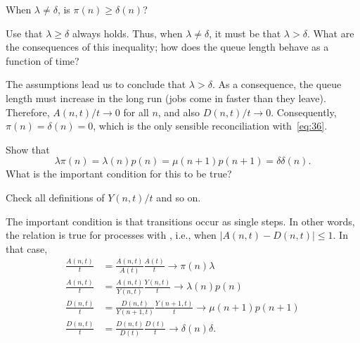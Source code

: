 \begin{exercise}
 When $\lambda\neq \delta$, is $\pi(n)\geq \delta(n)$? 
\begin{hint}
 Use that $\lambda \geq \delta$ always holds. Thus, when $\lambda \neq \delta$, it must be that $\lambda > \delta$. What are the consequences of this inequality; how does the queue length behave as a function of time?
\end{hint}
\begin{solution}
 The assumptions lead us to conclude that $\lambda > \delta$. As a consequence, the queue length must increase in the long run (jobs come in faster than they leave). Therefore, $A(n,t)/t \to 0$ for all $n$, and also $D(n,t)/t\to 0$. Consequently, $\pi(n) = \delta(n) = 0$, which is the only sensible reconciliation with~\cref{eq:36}. 
\end{solution}
\end{exercise}

\begin{extra}
Show that 
\begin{equation*}
\lambda \pi(n) = \lambda(n) p(n) = \mu(n+1) p(n+1) = \delta \delta(n).
\end{equation*}
What is the important condition for this to be true?
\begin{hint}
Check all definitions of $Y(n,t)/t$ and so on.
\end{hint}
\begin{solution}
 The important condition is that transitions occur as single
 steps. In other words, the relation is true for processes with
 , i.e., when $|A(n,t) - D(n,t)|\leq 1$.
 In that case, 
\begin{align*}
 \frac{A(n,t)}{t} &= \frac{A(n,t)}{A(t)} \frac{A(t)}{t} \to \pi(n) \lambda\\
 \frac{A(n,t)}{t} &= \frac{A(n,t)}{Y(n,t)} \frac{Y(n,t)}{t} \to \lambda(n)p(n)\\
 \frac{D(n,t)}{t} &= \frac{D(n,t)}{Y(n+1,t)} \frac{Y(n+1,t)}{t} \to \mu(n+1)p(n+1)\\
 \frac{D(n,t)}{t} &= \frac{D(n,t)}{D(t)} \frac{D(t)}{t} \to \delta(n)\delta. \\
\end{align*}
\end{solution}
\end{extra}

